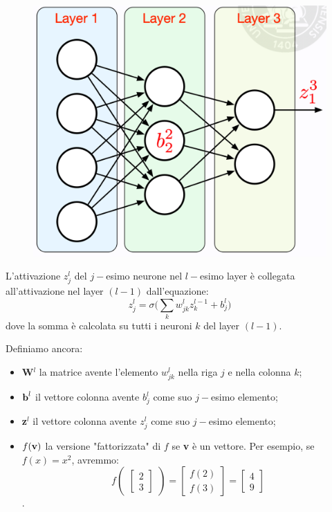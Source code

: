 \begin{figure}[!h]
    \includegraphics[scale=.4]{images/backpropagation/matrixNotation02.png}
    \centering
\end{figure}


L'attivazione $z_j^l$ del $j-$esimo neurone nel $l-$esimo layer è collegata all'attivazione nel layer $(l-1)$  dall'equazione:
\begin{equation}
    z_j^l=\sigma\Big(\sum_k w^l_{jk} z^{l-1}_k + b_j^l \Big)
\end{equation}
dove la somma è calcolata su tutti i neuroni $k$ del layer $(l-1)$.


Definiamo ancora:
\begin{itemize}
    \item \textbf{W}$^l$ la matrice avente l'elemento $w^l_{jk}$ nella riga $j$ e nella colonna $k$;
    \item $\text{\textbf{b}}^l$ il vettore colonna avente $b_j^l$ come suo $j-$esimo elemento;
    \item \textbf{z}$^l$ il vettore colonna avente $z_j^l$ come suo $j-$esimo elemento;
    \item $f(\textbf{\textbf{v}})$ la versione "fattorizzata" di $f$ se \textbf{v} è un vettore. Per esempio, se $f(x)=x^2$, avremmo:
    \begin{equation}
        f
    \begin{pmatrix}
    \begin{bmatrix}
        2\\
        3
    \end{bmatrix}
    \end{pmatrix}
    =
    \begin{bmatrix}
        f(2)\\
        f(3)
    \end{bmatrix}
    =
    \begin{bmatrix}
        4\\
        9
    \end{bmatrix}
    \end{equation}.
\end{itemize}


